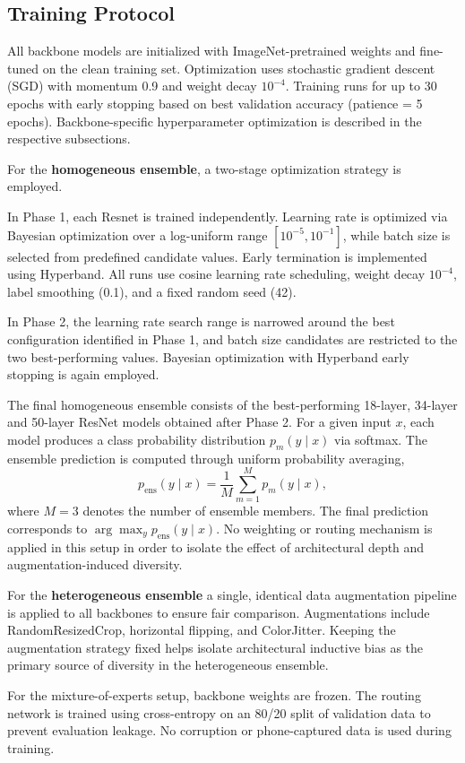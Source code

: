 \subsection{Training Protocol}

All backbone models are initialized with ImageNet-pretrained weights and fine-tuned on the clean training set.
Optimization uses stochastic gradient descent (SGD) with momentum 0.9 and weight decay $10^{-4}$.
Training runs for up to 30 epochs with early stopping based on best validation accuracy (patience = 5 epochs).
Backbone-specific hyperparameter optimization is described in the respective subsections.

For the \textbf{homogeneous ensemble}, a two-stage optimization strategy is employed.

In Phase 1, each Resnet is trained independently.
Learning rate is optimized via Bayesian optimization over a log-uniform range $[10^{-5}, 10^{-1}]$, while batch size is selected from predefined candidate values. 
Early termination is implemented using Hyperband. 
All runs use cosine learning rate scheduling, weight decay $10^{-4}$, label smoothing (0.1), and a fixed random seed (42).

In Phase 2, the learning rate search range is narrowed around the best configuration identified in Phase 1, and batch size candidates are restricted to the two best-performing values. 
Bayesian optimization with Hyperband early stopping is again employed.

The final homogeneous ensemble consists of the best-performing 18-layer, 34-layer and 50-layer ResNet models obtained after Phase 2.
For a given input $x$, each model produces a class probability distribution $p_m(y \mid x)$ via softmax. 
The ensemble prediction is computed through uniform probability averaging,
\[
p_{\text{ens}}(y \mid x) = \frac{1}{M} \sum_{m=1}^{M} p_m(y \mid x),
\]
where $M=3$ denotes the number of ensemble members. 
The final prediction corresponds to $\arg\max_y p_{\text{ens}}(y \mid x)$. 
No weighting or routing mechanism is applied in this setup in order to isolate the effect of architectural depth and augmentation-induced diversity.

For the \textbf{heterogeneous ensemble} a single, identical data augmentation pipeline is applied to all backbones to ensure fair comparison.
Augmentations include RandomResizedCrop, horizontal flipping, and ColorJitter.
Keeping the augmentation strategy fixed helps isolate architectural inductive bias as the primary source of diversity in the heterogeneous ensemble.

For the mixture-of-experts setup, backbone weights are frozen.
The routing network is trained using cross-entropy on an 80/20 split of validation data to prevent evaluation leakage.
No corruption or phone-captured data is used during training.

